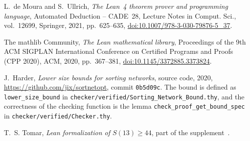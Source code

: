L.~de Moura and S.~Ullrich, \emph{The Lean~4 theorem prover and programming language}, Automated
Deduction -- CADE~28, Lecture Notes in Comput. Sci., vol.~12699, Springer, 2021, pp.~625--635,
\href{https://doi.org/10.1007/978-3-030-79876-5_37}{doi:10.1007/978-3-030-79876-5\_37}.

The mathlib Community, \emph{The Lean mathematical library}, Proceedings of the 9th ACM SIGPLAN International
Conference on Certified Programs and Proofs (CPP 2020), ACM, 2020, pp.~367--381,
\href{https://doi.org/10.1145/3372885.3373824}{doi:10.1145/3372885.3373824}.

J.~Harder, \emph{Lower size bounds for sorting networks}, source code, 2020,
\url{https://github.com/jix/sortnetopt}, commit \texttt{0b5d09c}. The bound is defined as
\texttt{lower\_size\_bound} in \texttt{checker/verified/Sorting\_Network\_Bound.thy}, and the correctness
of the checking function is the lemma \texttt{check\_proof\_get\_bound\_spec} in
\texttt{checker/verified/Checker.thy}.

T.~S. Tomar, \emph{Lean formalization of $S(13)\ge44$}, part of the supplement~\cite{Supp}.
